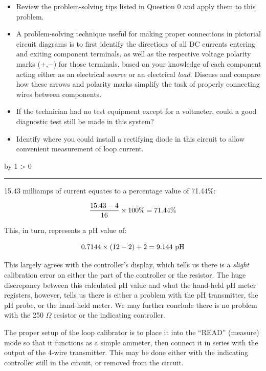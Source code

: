 \documentclass[12pt,a4paper]{article}
\def\svar{
           \advance\answnum by 1
           \ifnum \answnum > 0
                \hrule
                \vskip 3pt
                \leftline{Svar \the\answnum}
                \vskip 3pt \fi}
\begin{document}
\begin{itemize}
\item{} Review the problem-solving tips listed in Question 0 and apply them to this problem.
\item{} A problem-solving technique useful for making proper connections in pictorial circuit diagrams is to first identify the directions of all DC currents entering and exiting component terminals, as well as the respective voltage polarity marks (+,$-$) for those terminals, based on your knowledge of each component acting either as an electrical {\it source} or an electrical {\it load}.  Discuss and compare how these arrows and polarity marks simplify the task of properly connecting wires between components. 
\item{} If the technician had no test equipment except for a voltmeter, could a good diagnostic test still be made in this system?
\item{} Identify where you could install a rectifying diode in this circuit to allow convenient measurement of loop current.
\end{itemize}

\vskip 10pt \filbreak 





\svar{} 

15.43 milliamps of current equates to a percentage value of 71.44\%:

$${15.43 - 4 \over 16} \times 100\% = 71.44\%$$

This, in turn, represents a pH value of:

$$0.7144 \times (12 - 2) + 2 = 9.144 \hbox{ pH}$$

\vskip 10pt

This largely agrees with the controller's display, which tells us there is a {\it slight} calibration error on either the part of the controller or the resistor.  The huge discrepancy between this calculated pH value and what the hand-held pH meter registers, however, tells us there is either a problem with the pH transmitter, the pH probe, or the hand-held meter.  We may further conclude there is no problem with the 250 $\Omega$ resistor or the indicating controller.
 
\vskip 10pt

The proper setup of the loop calibrator is to place it into the ``READ'' (measure) mode so that it functions as a simple ammeter, then connect it in series with the output of the 4-wire transmitter.  This may be done either with the indicating controller still in the circuit, or removed from the circuit.
\end{document}
